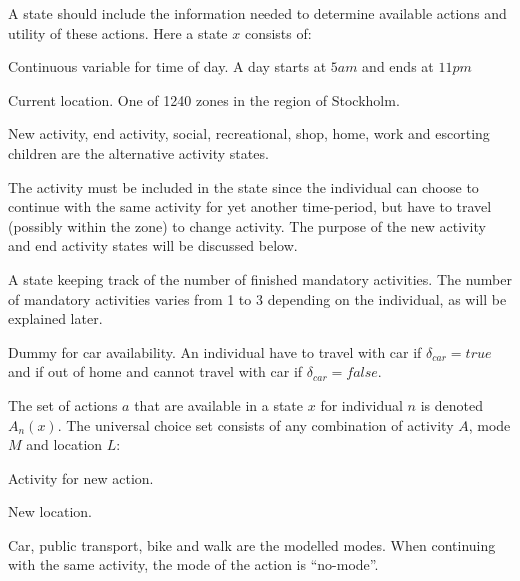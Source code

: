 A state should include the information needed to determine available actions and utility of these actions. Here a state $x$ consists of:
\begin{description}[style=multiline,leftmargin=4cm,font=\normalfont]
\item[{Time $t \in [5\unit{am},11\unit{pm}] $}:] Continuous variable for time of day. A day starts at $5\unit{am}$ and ends at $11\unit{pm}$
\item[{Location $L \in [1,1240]$:}] Current location. One of 1240 zones in the region of Stockholm. 
\item[Activity $A$:] New activity, end activity, social, recreational, shop, home, work and escorting children are the alternative activity states. 

The activity must be included in the state since the individual can choose to continue with the same activity for yet another time-period, but have to travel (possibly within the zone) to change activity. The purpose of the new activity and end activity states will be discussed below.
\item[{Errand indicator $E \in [0,3]$:}] A state keeping track of the number of finished mandatory activities. The number of mandatory activities varies from 1 to 3 depending on the individual, as will be explained later. 
\item[Car dummy $\delta_{car} \in \{true,false\}$:] Dummy for car availability. An individual have to travel with car if $\delta_{car} = true$ and if out of home and cannot travel with car if $\delta_{car} = false$.
\end{description}


The set of actions $a$ that are available in a state $x$ for individual $n$ is denoted $A_n(x)$. The universal choice set consists of any combination of activity $A$, mode $M$ and location $L$:
\begin{description}[style=multiline,leftmargin=4cm,font=\normalfont]
\item[{Activity $A$}:] Activity for new action.
\item[{Location $L$}:] New location. 
\item[{Mode}:] Car, public transport, bike and walk are the modelled modes. When continuing with the same activity, the mode of the action is ``no-mode''.
\end{description}


